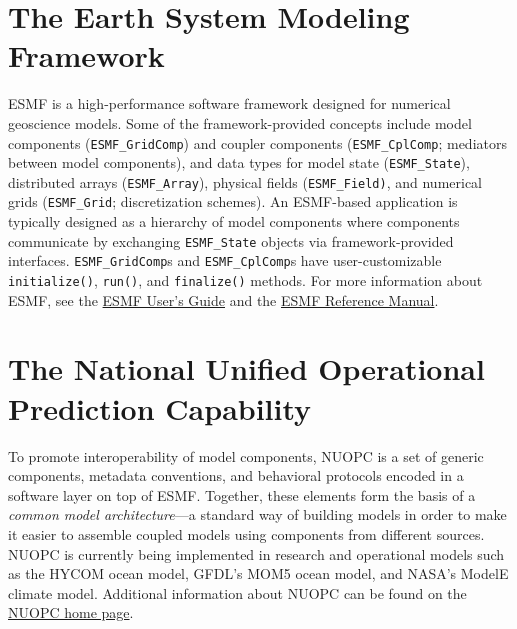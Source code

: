 \documentclass[oneside,11pt]{memoir}
\begin{document}
\section{The Earth System Modeling Framework}
ESMF is a high-performance software framework designed for numerical geoscience models. Some of the framework-provided concepts include model components (\texttt{ESMF\_GridComp}) and coupler components (\texttt{ESMF\_CplComp}; mediators between model components), and data types for model state (\texttt{ESMF\_State}), distributed arrays (\texttt{ESMF\_Array}), physical fields (\texttt{ESMF\_Field)}, and numerical grids (\texttt{ESMF\_Grid}; discretization schemes). An ESMF-based application is typically designed as a hierarchy of model components where components communicate by exchanging \texttt{ESMF\_State} objects via framework-provided interfaces. \texttt{ESMF\_GridComp}s and \texttt{ESMF\_CplComp}s have user-customizable \texttt{initialize()}, \texttt{run()}, and \texttt{finalize()} methods.  For more information about ESMF, see the \href{http://www.earthsystemmodeling.org/esmf_releases/public/last/ESMF_usrdoc/}{ESMF User's Guide} and the \href{http://www.earthsystemmodeling.org/esmf_releases/public/last/ESMF_refdoc/}{ESMF Reference Manual}.

\section{The National Unified Operational Prediction Capability}
To promote interoperability of model components, NUOPC is a set of generic components, metadata conventions, and behavioral protocols encoded in a software layer on top of ESMF. Together, these elements form the basis of a \emph{common model architecture}---a standard way of building models in order to make it easier to assemble coupled models using components from different sources. NUOPC is currently being implemented in research and operational models such as the HYCOM ocean model, GFDL's MOM5 ocean model, and NASA's ModelE climate model.  Additional information about NUOPC can be found on the \href{https://earthsystemcog.org/projects/nuopc/}{NUOPC home page}.

\end{document}
